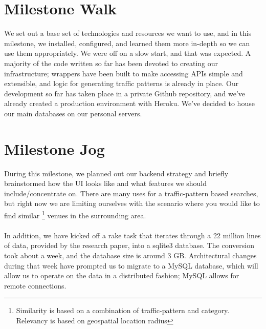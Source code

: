 \documentclass{article}
\begin{document}
%


%
\section{Milestone Walk}
We set out a base set of technologies and resources we want to use, and in this milestone, we installed,
configured, and learned them more in-depth so we can use them appropriately. We were off on a slow start,
and that was expected. A majority of the code written so far has been devoted to creating our infrastructure;
wrappers have been built to make accessing APIs simple and extensible, and logic for generating traffic
patterns is already in place. Our development so far has taken place in a private Github repository, 
and we've already created a production environment with Heroku. We've decided to house our main databases 
on our personal servers.

\section{Milestone Jog}
During this milestone, we planned out our backend strategy and briefly brainstormed how the UI looks like and 
what features we should include/concentrate on. There are many uses for a traffic-pattern based searches, but 
right now we are limiting ourselves with the scenario where you would like to find similar
\footnote{Similarity is based on a combination of traffic-pattern and category. Relevancy is based on  
geospatial location radius} venues in the surrounding area. \\ \\
In addition, we have kicked off a rake task that iterates through a 22 million lines of data, provided
by the research paper, into a sqlite3 database. The conversion took about a week, and the database
size is around 3 GB. Architectural changes during that week have prompted us to migrate to a MySQL database, 
which will allow us to operate on the data in a distributed fashion; MySQL allows for remote connections.
\end{document}

